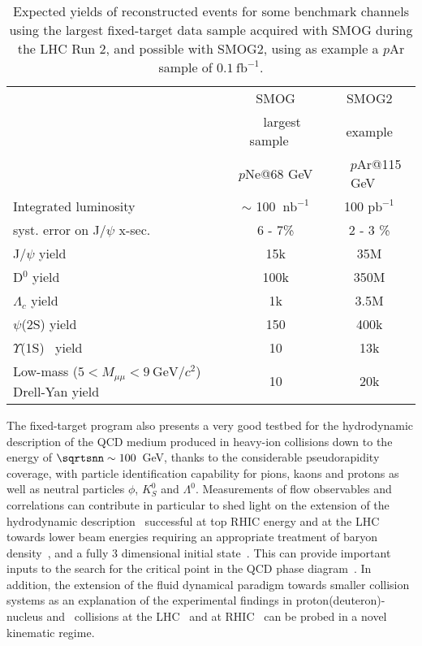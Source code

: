 \documentclass[../report.tex]{subfiles}
\begin{document}
\begin{table}[tb]
\caption{Expected yields of reconstructed events for some benchmark channels
using the largest fixed-target data sample acquired with SMOG during
the LHC Run 2, and possible with SMOG2, using as example a $p$Ar sample of $0.1~\textrm{fb}^{-1}$.
}
\label{tab:ftyields}
  \centering
  \begin{tabular}{lcc}
                               & SMOG                   &   SMOG2     \\
                               &  ~~largest sample~~    &    example  \\
                               &  $p$Ne@68 GeV            &  ~~$p$Ar@115 GeV~~   \\ \hline
Integrated luminosity          & $\sim$ 100 $~\textrm{nb}^{-1}$      &    100 $\textrm{pb}^{-1}$  \\
syst. error on J/$\psi$ x-sec.    &     6 - 7\%            &    2 - 3  \%     \\
J/$\psi$ yield                    &      15k               &      35M          \\
D$^0$ yield                      &      100k              &      350M         \\
$\Lambda_c$ yield                      &       1k               &      3.5M         \\
$\psi$(2S) yield                 &       150              &      400k         \\
$\Upsilon$(1S)~ yield                   &       10               &       13k         \\
Low-mass ($5<M_{\mu\mu}<9~\textrm{GeV}/c^{2}$) Drell-Yan yield       &       10               &       20k         \\
  \end{tabular}
\end{table}


The fixed-target program also presents a very good testbed for the
hydrodynamic description of the QCD medium produced in heavy-ion collisions
down to the energy of $\sqrtsnn \sim 100$~GeV, thanks to the
considerable pseudorapidity coverage, with particle identification capability for pions,
kaons and protons as well as neutral particles $\phi$, $K^0_S$ and $\Lambda^0$.
Measurements of flow observables and correlations can contribute in particular to shed light on the
extension of the hydrodynamic description~\cite{Song:2007ux,Schenke:2010rr} 
successful at top RHIC energy and at the LHC towards lower beam
energies requiring an appropriate 
treatment of baryon density~\cite{Karpenko:2015xea}, and a fully 3 dimensional initial state~\cite{Shen:2017bsr}.
This can provide important inputs to the search for the critical point in
the QCD phase diagram~\cite{Stephanov:2004wx,Luo:2017faz}. 
In addition, the extension of the fluid dynamical paradigm towards smaller collision systems as an
explanation of the experimental findings in proton(deuteron)-nucleus and \pp~collisions
at the LHC~\cite{Khachatryan:2010gv,CMS:2012qk,Abelev:2012ola,Aad:2012gla,Aaij:2015qcq} and
at RHIC~\cite{Adare:2018toe} can be probed in a novel kinematic regime.
\end{document}

